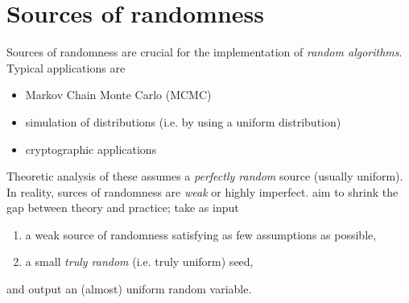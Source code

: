 \section{Sources of randomness}
Sources of randomness are crucial for the implementation of \emph{random algorithms}.
Typical applications are
\begin{itemize}
    \item Markov Chain Monte Carlo (MCMC)
    \item simulation of distributions (i.e. by using a uniform distribution)
    \item cryptographic applications
\end{itemize}
Theoretic analysis of these assumes a \emph{perfectly random} source (usually uniform).
In reality, surces of randomness are \emph{weak} or highly imperfect.
 aim to shrink the gap between theory and practice;
take as input
\begin{enumerate}
    \item a weak source of randomness satisfying as few assumptions as possible,
    \item a small \emph{truly random} (i.e. truly uniform) seed,
\end{enumerate}
and output an (almost) uniform random variable.

